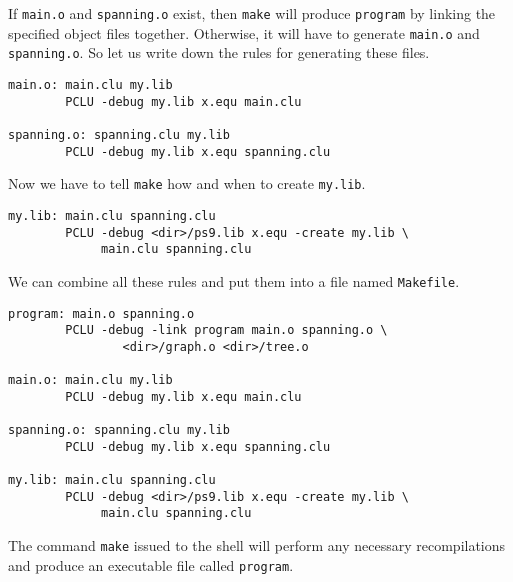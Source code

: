 \noindent If \verb|main.o| and \verb|spanning.o| exist, then
\verb|make| will produce \verb|program| by linking the specified
object files together. Otherwise, it will have to generate
\verb|main.o| and \verb|spanning.o|. So let us write down the
rules for generating these files.

\begin{indenttext}
\begin{verbatim}
main.o: main.clu my.lib
        PCLU -debug my.lib x.equ main.clu

spanning.o: spanning.clu my.lib
        PCLU -debug my.lib x.equ spanning.clu
\end{verbatim}
\end{indenttext}

\noindent Now we have to tell \verb|make| how and when to create
\verb|my.lib|.

\begin{indenttext}
\begin{verbatim}
my.lib: main.clu spanning.clu
        PCLU -debug <dir>/ps9.lib x.equ -create my.lib \
             main.clu spanning.clu
\end{verbatim}
\end{indenttext}

\noindent We can combine all these rules and put them into a file
named \verb|Makefile|.

\begin{indenttext}
\begin{verbatim}
program: main.o spanning.o
        PCLU -debug -link program main.o spanning.o \
                <dir>/graph.o <dir>/tree.o

main.o: main.clu my.lib
        PCLU -debug my.lib x.equ main.clu

spanning.o: spanning.clu my.lib
        PCLU -debug my.lib x.equ spanning.clu

my.lib: main.clu spanning.clu
        PCLU -debug <dir>/ps9.lib x.equ -create my.lib \
             main.clu spanning.clu
\end{verbatim}
\end{indenttext}

\noindent The command \verb|make| issued to the shell will perform any
necessary recompilations and produce an executable file called
\verb|program|.


